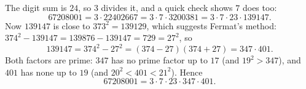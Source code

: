 The digit sum is $24$, so $3$ divides it, and a quick check shows $7$ does too:
\[67208001=3\cdot22402667=3\cdot7\cdot3200381=3\cdot7\cdot23\cdot139147.\]
Now $139147$ is close to $373^2=139129$, which suggests Fermat's method: $374^2-139147=139876-139147=729=27^2$, so
\[139147=374^2-27^2=(374-27)(374+27)=347\cdot401.\]
Both factors are prime: $347$ has no prime factor up to $17$ (and $19^2>347$), and $401$ has none up to $19$ (and $20^2<401<21^2$). Hence
\[67208001=\boxed{3\cdot7\cdot23\cdot347\cdot401}.\]
